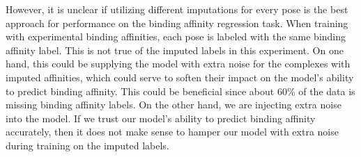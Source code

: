 \documentclass[journal=jmcmar,manuscript=article]{achemso}
\begin{document}
However, it is unclear if utilizing different imputations for every pose is the best approach for performance on the binding affinity regression task.
When training with experimental binding affinities, each pose is labeled with the same binding affinity label.
This is not true of the imputed labels in this experiment.
On one hand, this could be supplying the model with extra noise for the complexes with imputed affinities, which could serve to soften their impact on the model's ability to predict binding affinity.
This could be beneficial since about 60\% of the data is missing binding affinity labels.
On the other hand, we are injecting extra noise into the model.
If we trust our model's ability to predict binding affinity accurately, then it does not make sense to hamper our model with extra noise during training on the imputed labels.
\end{document}
